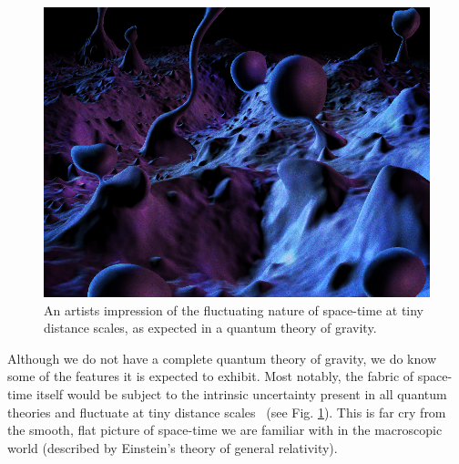\documentclass[a4paper,11pt]{article}
\begin{document}

\begin{figure} %
    \centering
		\includegraphics[width=1.\linewidth]{images/quantum_foam_2.png}
		\caption{An artists impression of the fluctuating nature of space-time at tiny distance scales, as expected in a quantum theory of gravity.}
		\vspace{-7pt}
		\label{fig:spacetime_foam}
\end{figure}

Although we do not have a complete quantum theory of gravity, we do know some of the features it is expected to exhibit. Most notably, the fabric of space-time itself would be subject to the intrinsic uncertainty present in all quantum theories and fluctuate at tiny distance scales~\cite{PhysRev.97.511, Hawking} (see Fig. \ref{fig:spacetime_foam}). This is far cry from the smooth, flat picture of space-time we are familiar with in the macroscopic world (described by Einstein's theory of general relativity). 
\end{document}
